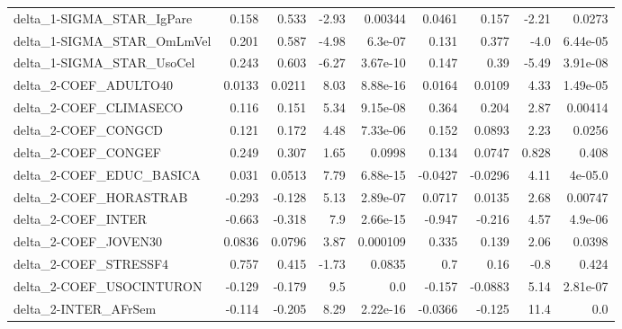\begin{tabular}{lrrrrrrrr}
delta\_1-SIGMA\_STAR\_IgPare             &       0.158 &        0.533 &   -2.93 &  0.00344 &     0.0461 &       0.157 &        -2.21 &        0.0273 \\
delta\_1-SIGMA\_STAR\_OmLmVel            &       0.201 &        0.587 &   -4.98 &  6.3e-07 &      0.131 &       0.377 &         -4.0 &      6.44e-05 \\
delta\_1-SIGMA\_STAR\_UsoCel             &       0.243 &        0.603 &   -6.27 & 3.67e-10 &      0.147 &        0.39 &        -5.49 &      3.91e-08 \\
delta\_2-COEF\_ADULTO40                 &      0.0133 &       0.0211 &    8.03 & 8.88e-16 &     0.0164 &      0.0109 &         4.33 &      1.49e-05 \\
delta\_2-COEF\_CLIMASECO                &       0.116 &        0.151 &    5.34 & 9.15e-08 &      0.364 &       0.204 &         2.87 &       0.00414 \\
delta\_2-COEF\_CONGCD                   &       0.121 &        0.172 &    4.48 & 7.33e-06 &      0.152 &      0.0893 &         2.23 &        0.0256 \\
delta\_2-COEF\_CONGEF                   &       0.249 &        0.307 &    1.65 &   0.0998 &      0.134 &      0.0747 &        0.828 &         0.408 \\
delta\_2-COEF\_EDUC\_BASICA              &       0.031 &       0.0513 &    7.79 & 6.88e-15 &    -0.0427 &     -0.0296 &         4.11 &       4e-05.0 \\
delta\_2-COEF\_HORASTRAB                &      -0.293 &       -0.128 &    5.13 & 2.89e-07 &     0.0717 &      0.0135 &         2.68 &       0.00747 \\
delta\_2-COEF\_INTER                    &      -0.663 &       -0.318 &     7.9 & 2.66e-15 &     -0.947 &      -0.216 &         4.57 &       4.9e-06 \\
delta\_2-COEF\_JOVEN30                  &      0.0836 &       0.0796 &    3.87 & 0.000109 &      0.335 &       0.139 &         2.06 &        0.0398 \\
delta\_2-COEF\_STRESSF4                 &       0.757 &        0.415 &   -1.73 &   0.0835 &        0.7 &        0.16 &         -0.8 &         0.424 \\
delta\_2-COEF\_USOCINTURON              &      -0.129 &       -0.179 &     9.5 &      0.0 &     -0.157 &     -0.0883 &         5.14 &      2.81e-07 \\
delta\_2-INTER\_AFrSem                  &      -0.114 &       -0.205 &    8.29 & 2.22e-16 &    -0.0366 &      -0.125 &         11.4 &           0.0 \\

\end{tabular}
